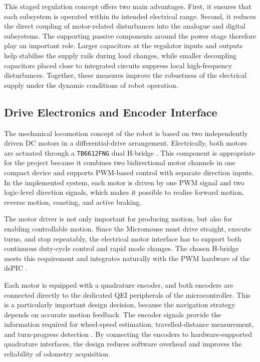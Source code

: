 This staged regulation concept offers two main advantages. First, it ensures that each subsystem is operated within its intended electrical range. Second, it reduces the direct coupling of motor-related disturbances into the analogue and digital subsystems. The supporting passive components around the power stage therefore play an important role. Larger capacitors at the regulator inputs and outputs help stabilise the supply rails during load changes, while smaller decoupling capacitors placed close to integrated circuits suppress local high-frequency disturbances. Together, these measures improve the robustness of the electrical supply under the dynamic conditions of robot operation.

\subsection{Drive Electronics and Encoder Interface}

The mechanical locomotion concept of the robot is based on two independently driven DC motors in a differential-drive arrangement. Electrically, both motors are actuated through a \texttt{TB6612FNG} dual H-bridge \cite{datasheet_tb6612fng}. This component is appropriate for the project because it combines two bidirectional motor channels in one compact device and supports PWM-based control with separate direction inputs. In the implemented system, each motor is driven by one PWM signal and two logic-level direction signals, which makes it possible to realise forward motion, reverse motion, coasting, and active braking.

The motor driver is not only important for producing motion, but also for enabling controllable motion. Since the Micromouse must drive straight, execute turns, and stop repeatably, the electrical motor interface has to support both continuous duty-cycle control and rapid mode changes. The chosen H-bridge meets this requirement and integrates naturally with the PWM hardware of the dsPIC \cite{datasheet_tb6612fng,datasheet_dspic}.

Each motor is equipped with a quadrature encoder, and both encoders are connected directly to the dedicated QEI peripherals of the microcontroller. This is a particularly important design decision, because the navigation strategy depends on accurate motion feedback. The encoder signals provide the information required for wheel-speed estimation, travelled-distance measurement, and turn-progress detection \cite{datasheet_motor}. By connecting the encoders to hardware-supported quadrature interfaces, the design reduces software overhead and improves the reliability of odometry acquisition.

